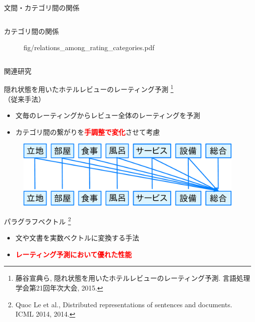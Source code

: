 \documentclass[aspectratio=43,unicode,10pt]{beamer}
\newcommand{\fire}[1]{\textcolor{red}{\textbf{#1}}}
\begin{document}
\begin{frame}{文間・カテゴリ間の関係}{}
\begin{columns}[t]
\begin{column}{0.4\textwidth}
\begin{block}{カテゴリ間の関係}
\begin{figure}
                          {fig/relations_among_rating_categories.pdf}
        \end{figure}
      \end{block}
    \end{column}
  \end{columns}
\end{frame}

\begin{frame}{関連研究}{}
  \begin{block}{隠れ状態を用いたホテルレビューのレーティング予測
                \footnote[frame]{
    藤谷宣典ら,
    隠れ状態を用いたホテルレビューのレーティング予測.
    言語処理学会第21回年次大会, 2015.
  }\\（従来手法）}
    \begin{itemize}
      \item 文毎のレーティングからレビュー全体のレーティングを予測
      \item カテゴリ間の繋がりを\fire{手調整で変化}させて考慮
    \end{itemize}
    \begin{figure}
      \vspace{-1em} %
      \includegraphics[width=0.5\linewidth]
                      {fig/fujitani_miml_relations_among_categories.pdf}
      \vspace{-1em} %
    \end{figure}
  \end{block}
  \begin{block}{パラグラフベクトル
                \footnote[frame]{
    Quoc Le et al.,
    Distributed representations of sentences and documents.
    ICML 2014, 2014.
  }}
    \begin{itemize}
      \item 文や文書を実数ベクトルに変換する手法
      \item \fire{レーティング予測において優れた性能}
    \end{itemize}
  \end{block}
\end{frame}
\end{document}
